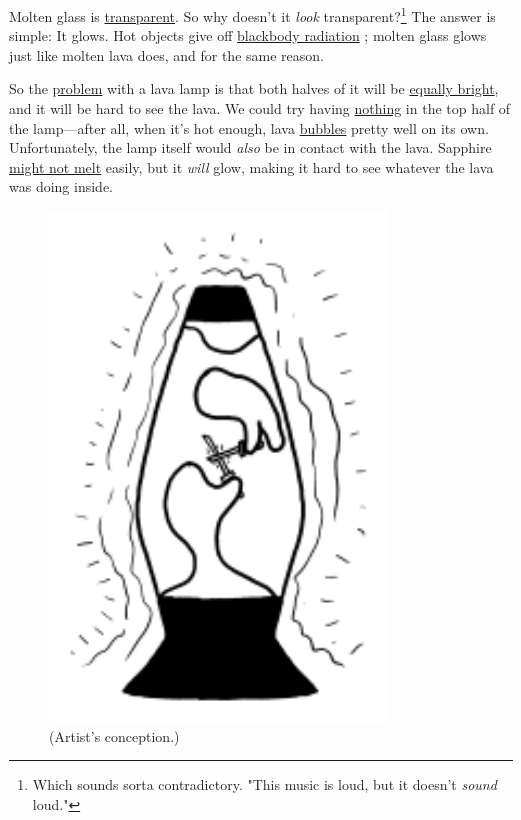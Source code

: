 {{Molten glass is \href{https://www.youtube.com/watch?v=1WmJOhbpyKY}{transparent}. So why doesn't it \emph{look} transparent?{\footnote{Which sounds sorta contradictory. "This music is loud, but it doesn't \emph{sound} loud."} } The answer is simple: It glows. Hot objects give off \href{https://www.youtube.com/watch?v=-QhU8eMR4IQ}{blackbody radiation} ; molten glass glows just like molten lava does, and for the same reason.}

{So the \href{https://www.youtube.com/watch?v=bWswq8PmRII}{problem} with a lava lamp is that both halves of it will be \href{https://www.youtube.com/watch?v=xsJn8izcKtg}{equally bright}, and it will be hard to see the lava. We could try having \href{https://www.youtube.com/watch?v=xiYzYaLM-hQ}{nothing} in the top half of the lamp—after all, when it's hot enough, lava \href{https://www.youtube.com/watch?v=EFVQhcuT2U0}{bubbles} pretty well on its own. Unfortunately, the lamp itself would \emph{also} be in contact with the lava. Sapphire \href{https://www.youtube.com/watch?v=2dww24LeoEk}{might not melt} easily, but it \emph{will} glow, making it hard to see whatever the lava was doing inside.}

\begin{figure}[!htbp]
\centering
\includegraphics[scale=0.5, max width=0.8\textwidth]{imgs/a/122/inside.png}
\caption{(Artist's conception.)}
\end{figure}

}
